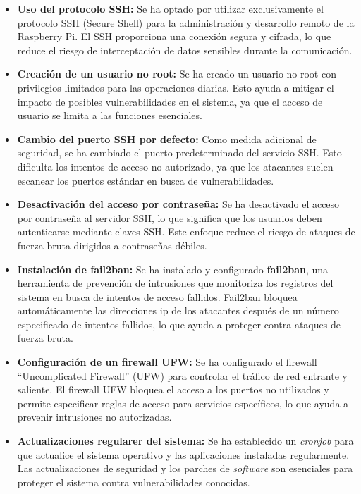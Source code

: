 \begin{itemize}
    \item \textbf{Uso del protocolo SSH:} Se ha optado por utilizar exclusivamente el protocolo SSH (Secure Shell) para la administración y desarrollo remoto de la Raspberry Pi. El SSH proporciona una conexión segura y cifrada, lo que reduce el riesgo de interceptación de datos sensibles durante la comunicación.
    
    \item \textbf{Creación de un usuario no root:} Se ha creado un usuario no root con privilegios limitados para las operaciones diarias. Esto ayuda a mitigar el impacto de posibles vulnerabilidades en el sistema, ya que el acceso de usuario se limita a las funciones esenciales.
    
    \item \textbf{Cambio del puerto SSH por defecto:} Como medida adicional de seguridad, se ha cambiado el puerto predeterminado del servicio SSH. Esto dificulta los intentos de acceso no autorizado, ya que los atacantes suelen escanear los puertos estándar en busca de vulnerabilidades.
    
    \item \textbf{Desactivación del acceso por contraseña:} Se ha desactivado el acceso por contraseña al servidor SSH, lo que significa que los usuarios deben autenticarse mediante claves SSH. Este enfoque reduce el riesgo de ataques de fuerza bruta dirigidos a contraseñas débiles.
    
    \item \textbf{Instalación de fail2ban:} Se ha instalado y configurado \textbf{fail2ban}, una herramienta de prevención de intrusiones que monitoriza los registros del sistema en busca de intentos de acceso fallidos. Fail2ban bloquea automáticamente las direcciones ip de los atacantes después de un número especificado de intentos fallidos, lo que ayuda a proteger contra ataques de fuerza bruta.
    
    \item \textbf{Configuración de un firewall UFW:} Se ha configurado el firewall ``Uncomplicated Firewall'' (UFW) para controlar el tráfico de red entrante y saliente. El firewall UFW bloquea el acceso a los puertos no utilizados y permite especificar reglas de acceso para servicios específicos, lo que ayuda a prevenir intrusiones no autorizadas.
    
	\item \textbf{Actualizaciones regularer del sistema:} Se ha establecido un \textit{cronjob} para que actualice el sistema operativo y las aplicaciones instaladas regularmente. Las actualizaciones de seguridad y los parches de \textit{software} son esenciales para proteger el sistema contra vulnerabilidades conocidas.
\end{itemize}

